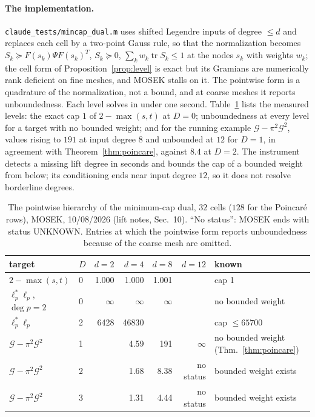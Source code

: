 \documentclass[12pt]{article}
\newcommand{\mcl}[1]{\mathcal{#1}}
\newcommand{\code}[1]{\texttt{#1}}
\DeclareMathOperator{\tr}{tr}
\theoremstyle{plain}
\theoremstyle{definition}
\theoremstyle{remark}
\begin{document}
\paragraph{The implementation.} \code{claude\_tests/mincap\_dual.m} uses shifted Legendre inputs of degree $\le d$ and replaces each cell by a two-point Gauss rule, so that the normalization becomes $S_k\succeq F(s_k)\Psi F(s_k)^T$, $S_k\succeq0$, $\sum_kw_k\tr S_k\le1$ at the nodes $s_k$ with weights $w_k$; the cell form of Proposition~\ref{prop:level} is exact but its Gramians are numerically rank deficient on fine meshes, and MOSEK stalls on it. The pointwise form is a quadrature of the normalization, not a bound, and at coarse meshes it reports unboundedness. Each level solves in under one second. Table~\ref{tab:mincap} lists the measured levels: the exact cap $1$ of $2-\max(s,t)$ at $D=0$; unboundedness at every level for a target with no bounded weight; and for the running example $\mcl G-\pi^2\mcl G^2$, values rising to $191$ at input degree $8$ and unbounded at $12$ for $D=1$, in agreement with Theorem~\ref{thm:poincare}, against $8.4$ at $D=2$. The instrument detects a missing lift degree in seconds and bounds the cap of a bounded weight from below; its conditioning ends near input degree $12$, so it does not resolve borderline degrees.

\begin{table}[h]\centering\footnotesize
\setlength{\tabcolsep}{5pt}
\begin{tabular}{llrrrrl}
\toprule
target & $D$ & $d=2$ & $d=4$ & $d=8$ & $d=12$ & known \\
\midrule
$2-\max(s,t)$ & 0 & 1.000 & 1.000 & 1.001 & & cap 1 \\
$\ell_p^*\ell_p$, $\deg p=2$ & 0 & $\infty$ & $\infty$ & $\infty$ & & no bounded weight \\
$\ell_p^*\ell_p$ & 2 & 6428 & 46830 & & & cap $\le65700$ \\
$\mcl G-\pi^2\mcl G^2$ & 1 & & 4.59 & 191 & $\infty$ & no bounded weight (Thm.~\ref{thm:poincare}) \\
$\mcl G-\pi^2\mcl G^2$ & 2 & & 1.68 & 8.38 & no status & bounded weight exists \\
$\mcl G-\pi^2\mcl G^2$ & 3 & & 1.31 & 4.44 & no status & bounded weight exists \\
\bottomrule
\end{tabular}
\caption{The pointwise hierarchy of the minimum-cap dual, $32$ cells ($128$ for the Poincar\'e rows), MOSEK, 10/08/2026 (lift notes, Sec.~10). ``No status'': MOSEK ends with status UNKNOWN. Entries at which the pointwise form reports unboundedness because of the coarse mesh are omitted.}\label{tab:mincap}
\end{table}
\end{document}
